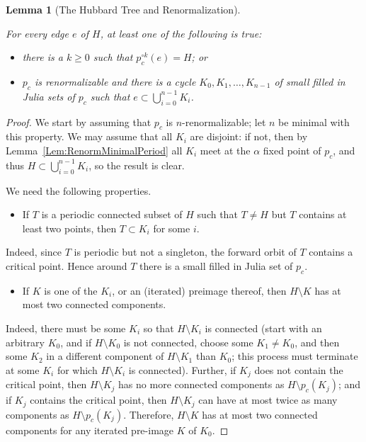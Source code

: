 \documentclass[12pt]{amsart}
\newcommand{\sm}{\setminus}
\newcommand{\0}{\texttt{0}}
\newcommand{\1}{\texttt{1}}
\newtheorem{lemma}[theorem]{Lemma}
\theoremstyle{definition}
\numberwithin{equation}{section}
\newcommand{\lineclear}{\rule{0pt}{2pt}\newline}
\begin{document}
\begin{lemma}[The Hubbard Tree and Renormalization]
\label{Lem:HubbardTreeRenormalization} \lineclear
For every edge $e$ of $H$, at least one of the following is true:
\begin{itemize}
\item there is a $k\ge 0$ such that $p_c^{\circ k}(e)=H$; or
\item $p_c$ is renormalizable and there is a cycle $K_0,K_1,\dots ,K_{n-1}$ of small filled in Julia sets of $p_c$ such that $e\subset \bigcup_{i=0}^{n-1}K_i$.
\end{itemize}
\end{lemma}
\begin{proof}
We start by assuming that $p_c$ is $n$-renormalizable; let $n$ be minimal with this property. We may assume that all $K_i$ are disjoint: if not, then by Lemma~\ref{Lem:RenormMinimalPeriod} all $K_i$ meet at the $\alpha$ fixed point of $p_c$, and thus $H\subset \bigcup_{i=0}^{n-1}K_i$, so the result is clear.


 We need the following properties.
\begin{itemize}
\item[(A)] 
If $T$ is %
%
a periodic connected subset of $H$ such that $T \neq H$ but $T$ contains at least two points, then $T\subset K_i$ for some $i$. 
\end{itemize}
Indeed, since $T$ is periodic but not a singleton,  the forward orbit of $T$ contains a critical point. Hence around $T$ there is a small filled in Julia set of $p_c$.
\begin{itemize}
\item[(B)] 
If $K$ is one of the $K_i$, or an (iterated) preimage thereof, then $H\sm K$ has at most two connected components.
\end{itemize}
Indeed, there must be some $K_i$ so that $H\sm K_i$ is connected (start with an arbitrary $K_0$, and if $H\sm K_0$ is not connected, choose some $K_1\neq K_0$, and then some $K_2$ in a different component of $H\sm K_1$ than $K_0$; this process must terminate at some $K_i$ for which $H\sm K_i$ is connected).  Further, if $K_j$ does not contain the critical point, then $H\sm K_j$ has no more connected components as $H\sm p_c(K_j)$; and if $K_j$ contains the critical point, then $H\sm K_j$ can have at most twice as many components as $H\sm p_c(K_j)$. Therefore, $H\sm K$ has at most two connected components for any iterated pre-image $K$ of $K_0$.



\end{proof}
\end{document}
